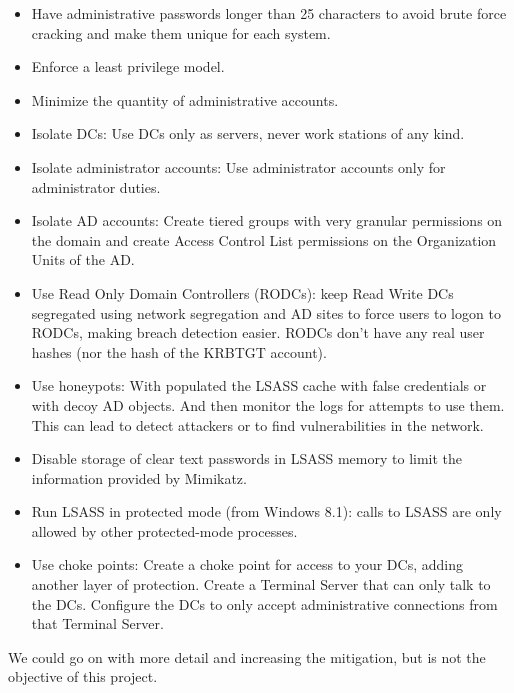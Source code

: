 \begin{itemize}
	\item Have administrative passwords longer than 25 characters to avoid brute force cracking and make them unique for each system.
	\item Enforce a least privilege model.
	\item Minimize the quantity of administrative accounts.
	\item Isolate DCs: Use DCs only as servers, never work stations of any kind.
	\item Isolate administrator accounts: Use administrator accounts only for administrator duties.
	\item Isolate AD accounts: Create tiered groups with very granular permissions on the domain and create Access Control List permissions on the Organization Units of the AD\cite{AD_tier}.
	\item Use Read Only Domain Controllers (RODCs): keep Read Write DCs segregated using network segregation and AD sites to force users to logon to RODCs, making breach detection easier. RODCs don't have any real user hashes (nor the hash of the KRBTGT account)\cite{hood}\cite{reset_RODC}.
	\item Use honeypots: With populated the LSASS cache with false credentials\cite{SANS_mimikatz}\cite{honeyhashes} or with decoy AD objects\cite{decoy_AD}. And then monitor the logs for attempts to use them. This can lead to detect attackers or to find vulnerabilities in the network.
	\item Disable storage of clear text passwords in LSASS memory to limit the information provided by Mimikatz\cite{SANS_mimikatz}.
	\item Run LSASS in protected mode (from Windows 8.1): calls to LSASS are only allowed by other protected-mode processes\cite{SANS_mimikatz}\cite{understanding_powersploit_mimikatz}.
	\item Use choke points: Create a choke point for access to your DCs, adding another layer of protection. Create a Terminal Server that can only talk to the DCs. Configure the DCs to only accept administrative connections from that Terminal Server\cite{choke}.
\end{itemize}
\linej
We could go on with more detail and increasing the mitigation\cite{AD_defense}, but is not the objective of this project.

